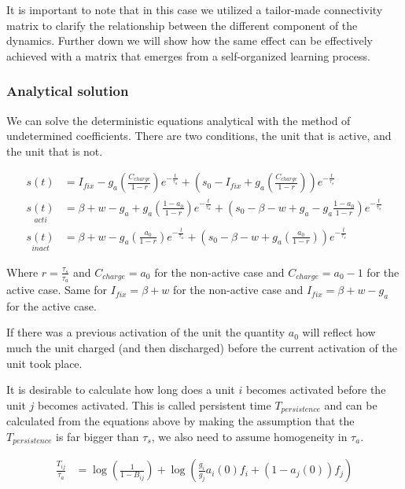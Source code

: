 \documentclass[10pt,a4paper]{article}
\begin{document}
It is important to note that in this case we utilized a tailor-made connectivity matrix to clarify the relationship between the different component of the dynamics. Further down we will show how the same effect can be effectively achieved with a matrix that emerges from a self-organized learning process.  

\subsubsection{Analytical solution}
We can solve the deterministic equations analytical with the method of undetermined coefficients. There are two conditions, the unit that is active, and the unit that is not. 


\begin{align} 
s(t) &= I_{fix} - g_a\left(\frac{C_{charge}}{1 - r} \right) e^{-\frac{t}{\tau_a}} + \left(s_0 - I_{fix} + g_a \left( \frac{C_{charge}}{1 - r}\right)\right)e^{-\frac{t}{\tau_s}} \label{eq:deterministic_solution}\\
\underset{acti}{s(t)} &= \beta + w - g_a + g_a \left(\frac{1 - a_0}{1 - r}\right) e^{-\frac{t}{\tau_a}} + \left(s_0 - \beta - w + g_a - g_a \frac{1 - a_0}{1 - r}\right) e^{-\frac{t}{\tau_s}}  \\ 
\underset{inact}{s(t)} &= \beta + w - g_a \left( \frac{a_0}{1 - r} \right) e^{-\frac{t}{\tau_a}} + \left(s_0 - \beta  - w  + g_a \left( \frac{a_0}{1 - r} \right) \right) e^{-\frac{t}{\tau_s}} 
\end{align}

Where $r=\frac{\tau_s}{\tau_a}$ and $C_{charge}=a_0$ for the non-active case and $C_{charge} = a_0 - 1$ for the active case. Same for $I_{fix}=\beta + w$ for the non-active case and $I_{fix} = \beta + w - g_a$ for the active case.  

If there was a previous activation of the unit the quantity $a_0$ will reflect how much the unit charged (and then discharged) before the current activation of the unit took place. 

It is desirable to calculate how long does a unit $i$ becomes activated before the unit $j$ becomes activated. This is called persistent time $T_{persistence}$ and can be calculated from the equations above by making the assumption that the $T_{persistence}$ is far bigger than $\tau_s$, we also need to assume homogeneity in $\tau_a$.

\begin{align*}
\frac{T_{ij}}{\tau_a} &= \log \left(\frac{1}{1 - B_{ij}} \right) +\log \left( \frac{g_i}{g_j}a_i(0)f_i + (1 - a_j(0))f_j \right) 
\end{align*}
\end{document}
